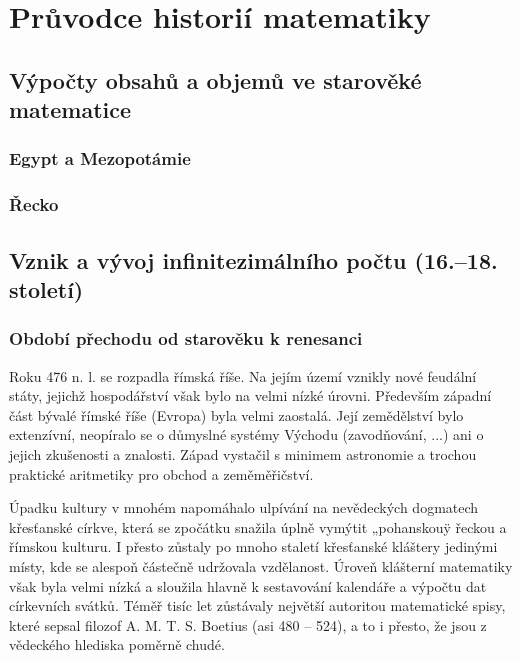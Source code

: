 \setchaptertoc
\chapter{Průvodce historií matematiky}\label{mai:OchapI}
  \section{Výpočty obsahů a objemů ve starověké matematice}\label{mai:OchapIsecI}
    \subsection{Egypt a Mezopotámie}\label{mai:OchapIsecIssecI}
    \subsection{Řecko}\label{mai:OchapIsecIssecII}
  \section{Vznik a vývoj infinitezimálního počtu (16.–18. století)}\label{mai:OchapIsecII}
    \subsection{Období přechodu od starověku k renesanci}
      Roku 476 n. l. se rozpadla římská říše. Na jejím území vznikly nové feudální státy, jejichž
      hospodářství však bylo na velmi nízké úrovni. Především západní část bývalé římské říše
      (Evropa) byla velmi zaostalá. Její zemědělství bylo extenzívní, neopíralo se o důmyslné
      systémy Východu (zavodňování, ...) ani o jejich zkušenosti a znalosti. Západ vystačil s
      minimem astronomie a trochou praktické aritmetiky pro obchod a zeměměřičství.

      Úpadku kultury v mnohém napomáhalo ulpívání na nevědeckých dogmatech křesťanské církve, která
      se zpočátku snažila úplně vymýtit „pohanskouÿ řeckou a římskou kulturu. I přesto zůstaly po
      mnoho staletí křesťanské kláštery jedinými místy, kde se alespoň částečně udržovala
      vzdělanost. Úroveň klášterní matematiky však byla velmi nízká a sloužila hlavně k sestavování
      kalendáře a výpočtu dat církevních svátků. Téměř tisíc let zůstávaly největší autoritou
      matematické spisy, které sepsal filozof A. M. T. S. Boetius (asi 480 – 524), a to i přesto, že
      jsou z vědeckého hlediska poměrně chudé.

